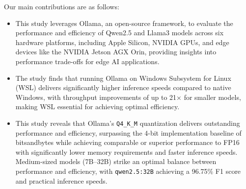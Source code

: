 \documentclass[conference]{IEEEtran}
\begin{document}
Our main contributions are as follows:

\begin{itemize}


    \item This study leverages Ollama, an open-source framework, to evaluate the performance and efficiency of Qwen2.5 and Llama3 models across six hardware platforms, including Apple Silicon, NVIDIA GPUs, and edge devices like the NVIDIA Jetson AGX Orin, providing insights into performance trade-offs for edge AI applications.
    \item The study finds that running Ollama on Windows Subsystem for Linux (WSL) delivers significantly higher inference speeds compared to native Windows, with throughput improvements of up to 21× for smaller models, making WSL essential for achieving optimal efficiency.
    \item This study reveals that Ollama's \texttt{Q4\_K\_M} quantization delivers outstanding performance and efficiency, surpassing the 4-bit implementation baseline of bitsandbytes while achieving comparable or superior performance to FP16 with significantly lower memory requirements and faster inference speeds. Medium-sized models (7B--32B) strike an optimal balance between performance and efficiency, with \texttt{qwen2.5:32B} achieving a 96.75\% F1 score and practical inference speeds.


\end{itemize}
\end{document}
